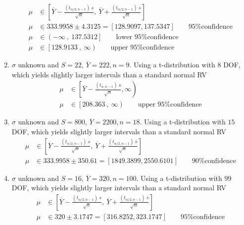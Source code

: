 \begin{enumerate}
		\begin{align}
			\mu &\in \left[ \overline{Y} - \frac{(t_{\alpha/2, n-1})\ s}{\sqrt{n}}, \ \overline{Y} + \frac{(t_{\alpha/2, n-1})\ s}{\sqrt{n}} \right] \nonumber \\
			\mu &\in 333.9958 \pm 4.3125 = [128.9097, 137.5347] \qquad \text{95\% confidence} \nonumber \\
			\mu &\in \left(-\infty\ ,\  137.5312\right] \qquad \text{lower 95\% confidence} \nonumber \\
			\mu &\in \left[128.9133\ ,\ \infty\right) \qquad \text{upper 95\% confidence}
		\end{align}
	
	
	\item $ \sigma $ unknown and $ S = 22 $, $ \overline{Y} = 222, n = 9$. Using a t-distribution with $ 8 $ DOF, which yields slightly larger intervals than a standard normal RV\\
	
		\begin{align}
			\mu &\in \left[ \overline{Y} - \frac{(t_{\alpha, n-1})\ s}{\sqrt{n}}, \infty \right) \nonumber \\
			\mu &\in \left[208.363\ ,\ \infty\right) \qquad \text{upper 95\% confidence}
		\end{align}
	
	
	\item $ \sigma $ unknown and $ S = 800 $, $ \overline{Y} = 2200, n = 18$. Using a t-distribution with $ 15 $ DOF, which yields slightly larger intervals than a standard normal RV\\
	
		\begin{align}
			\mu &\in \left[ \overline{Y} - \frac{(t_{\alpha/2, n-1})\ s}{\sqrt{n}}, \ \overline{Y} + \frac{(t_{\alpha/2, n-1})\ s}{\sqrt{n}} \right] \nonumber \\
			\mu &\in 333.9958 \pm 350.61 = [1849.3899, 2550.6101] \qquad \text{90\% confidence}
		\end{align}
	
	
	\item $ \sigma $ unknown and $ S = 16 $, $ \overline{Y} = 320, n = 100$. Using a t-distribution with $ 99 $ DOF, which yields slightly larger intervals than a standard normal RV\\
	
		\begin{align}
			\mu &\in \left[ \overline{Y} - \frac{(t_{\alpha/2, n-1})\ s}{\sqrt{n}}, \ \overline{Y} + \frac{(t_{\alpha/2, n-1})\ s}{\sqrt{n}} \right] \nonumber \\
			\mu &\in 320 \pm 3.1747 = [316.8252, 323.1747] \qquad \text{95\% confidence}
		\end{align}
	

\end{enumerate}
